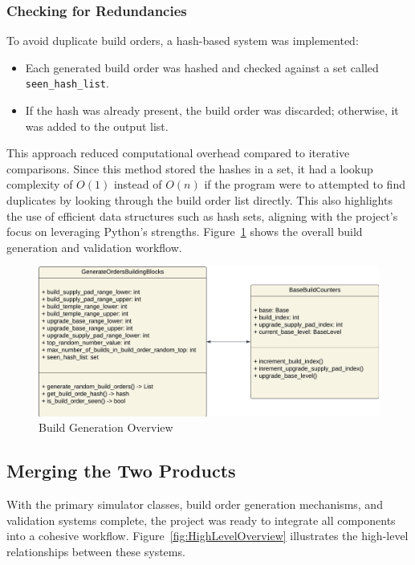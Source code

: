 \documentclass[a4paper, 12pt, english]{article}
\begin{document}
\newpage
\subsubsection{Checking for Redundancies}
To avoid duplicate build orders, a hash-based system was implemented:
\begin{itemize}
    \item Each generated build order was hashed and checked against a set called \texttt{seen\_hash\_list}.
    \item If the hash was already present, the build order was discarded; otherwise, it was added to the output list.
\end{itemize}

This approach reduced computational overhead compared to iterative comparisons. Since this method stored the hashes in a set, it had a lookup complexity of \(O(1)\) instead of \(O(n)\) if the program were to attempted to find duplicates by looking through the build order list directly. This also highlights the use of efficient data structures such as hash sets, aligning with the project’s focus on leveraging Python's strengths. Figure~\ref{fig:HashBasedValidation} shows the overall build generation and validation workflow.

\begin{figure}[!ht]
    \begin{center}
        \includegraphics[width=150mm,scale=1.0]{HaloWarsDiagramOrderGenerationOverview.png}
    \end{center}
    \caption{\label{fig:HashBasedValidation}Build Generation Overview}
\end{figure}


\subsection{Merging the Two Products}

With the primary simulator classes, build order generation mechanisms, and validation systems complete, the project was ready to integrate all components into a cohesive workflow. Figure~\ref{fig:HighLevelOverview} illustrates the high-level relationships between these systems.
\end{document}

